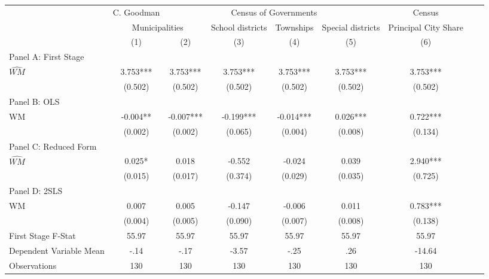  \begin{tabular}{l*{8}{c}} \toprule
&\multicolumn{1}{c}{C. Goodman}&\multicolumn{4}{c}{Census of Governments}&\multicolumn{1}{c}{Census}\\\cmidrule(lr){2-2}\cmidrule(lr){3-6}\cmidrule(lr){7-7}
&\multicolumn{2}{c}{Municipalities}&\multicolumn{1}{c}{School districts}&\multicolumn{1}{c}{Townships}&\multicolumn{1}{c}{Special districts}&\multicolumn{1}{c}{Principal City Share}\\\cmidrule(lr){2-3}\cmidrule(lr){4-6}\cmidrule(lr){7-7}
&\multicolumn{1}{c}{(1)}&\multicolumn{1}{c}{(2)}&\multicolumn{1}{c}{(3)}&\multicolumn{1}{c}{(4)}&\multicolumn{1}{c}{(5)}&\multicolumn{1}{c}{(6)}\\
\cmidrule(lr){1-7}
\multicolumn{6}{l}{Panel A: First Stage}\\
\cmidrule(lr){1-7}
$\widehat{WM}$  &    3.753***&    3.753***&    3.753***&    3.753***&    3.753***&    3.753***\\
                &  (0.502)   &  (0.502)   &  (0.502)   &  (0.502)   &  (0.502)   &  (0.502)   \\
\cmidrule(lr){1-7}
\multicolumn{6}{l}{Panel B: OLS}\\
\cmidrule(lr){1-7}
WM              &   -0.004** &   -0.007***&   -0.199***&   -0.014***&    0.026***&    0.722***\\
                &  (0.002)   &  (0.002)   &  (0.065)   &  (0.004)   &  (0.008)   &  (0.134)   \\
\cmidrule(lr){1-7}
\multicolumn{6}{l}{Panel C: Reduced Form}\\
\cmidrule(lr){1-7}
$\widehat{WM}$  &    0.025*  &    0.018   &   -0.552   &   -0.024   &    0.039   &    2.940***\\
                &  (0.015)   &  (0.017)   &  (0.374)   &  (0.029)   &  (0.035)   &  (0.725)   \\
\cmidrule(lr){1-7}
\multicolumn{6}{l}{Panel D: 2SLS}\\
\cmidrule(lr){1-7}
WM              &    0.007   &    0.005   &   -0.147   &   -0.006   &    0.011   &    0.783***\\
                &  (0.004)   &  (0.005)   &  (0.090)   &  (0.007)   &  (0.008)   &  (0.138)   \\
\midrule
First Stage F-Stat&    55.97   &    55.97   &    55.97   &    55.97   &    55.97   &    55.97   \\
Dependent Variable Mean&     -.14   &     -.17   &    -3.57   &     -.25   &      .26   &   -14.64   \\
Observations    &      130   &      130   &      130   &      130   &      130   &      130   \\
       \bottomrule \end{tabular}
